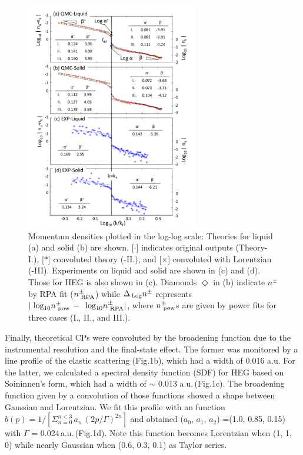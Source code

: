 \documentclass[twocolumn,showpacs,showkeys,fleqn,prl,superscriptaddress]{revtex4}%
\newcommand{\nn}[1]{\textnormal{ #1}}
\begin{document}
\begin{figure}
\includegraphics[bb= 70 10 500 700, width=7.5cm]{fig3.pdf}
\caption{Momentum densities plotted in the log-log scale:  Theories for liquid (a) and solid (b) are shown. [$\cdot$] indicates original outputs (Theory-I.), [$*$]  convoluted theory (-II.), and [$\times$] convoluted with Lorentzian (-III).  Experiments on liquid and solid are shown in (c) and (d). Those for HEG is also shown in (c).
Diamonds $\Diamond$ in (b) indicate $n^{\pm}$ by RPA fit ($n^{\pm}_{\nn{RPA}}$)  
while $\Delta_{\!\nn{Log}} n^{\pm}$ represents $ | \nn{log}_{10} n^{\pm}_{\nn{pow}} \,-\, \nn{log}_{10} n^{\pm}_{\nn{RPA}} | $,
where $ n^{\pm}_{\nn{pow}} $s are given by power fits for three cases (I., II., and III.).
} 
\label{Fig.3}
\end{figure}


Finally, theoretical CPs were convoluted by the broadening function due to the instrumental resolution and the final-state effect. 
The former was monitored by a line profile of the elastic scattering (Fig.1b), which had a width of 0.016 a.u.
For the latter, we calculated a spectral density function (SDF) for HEG based on Soininnen's form\cite{soi01}, which had a width of $\sim$ 0.013 a.u.\,(Fig.1c).
The broadening function given by a convolution of those functions showed a shape between Gaussian and Lorentzian.
We fit this profile with an function $b(p) =1/ [ \Sigma_{n=0}^{n<3}\,a_n\,(2p / \Gamma )^{2n} ]$ and obtained ($a_0$, $a_1$, $a_2$) =(1.0, 0.85, 0.15) with $\Gamma$ = 0.024\,a.u.\,(Fig.1d).
Note this function becomes Lorentzian when (1, 1, 0) while nearly Gaussian when (0.6, 0.3, 0.1) as Taylor series. 
\end{document}
